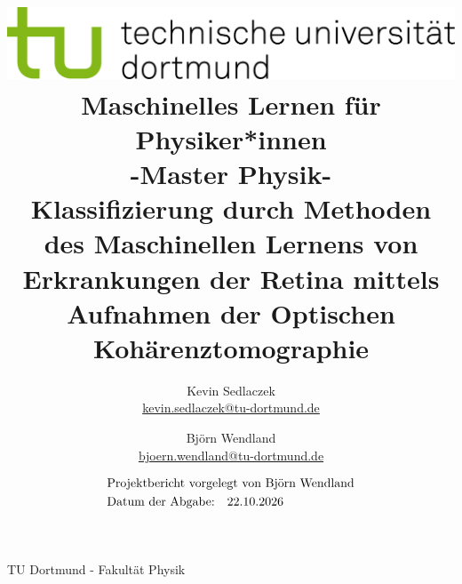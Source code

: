 \documentclass[12pt,a4paper,headsepline,bibtotocnumbered]{scrartcl}
\title{\vspace{-0.7cm}\includegraphics[scale=0.8]{tud-logo.jpg} \\ \vspace*{1cm} Maschinelles Lernen für Physiker*innen \\ -Master Physik- \\ \vspace*{1cm} 
Klassifizierung durch Methoden des Maschinellen Lernens von Erkrankungen der Retina mittels Aufnahmen der Optischen Kohärenztomographie  \vspace*{1cm} }
\author{Kevin Sedlaczek \\ \href{mailto:kevin.sedlaczek@tu-dortmund.de}{kevin.sedlaczek@tu-dortmund.de} \and 
	Björn Wendland \\ \href{mailto:bjoern.wendland@tu-dortmund.de}{bjoern.wendland@tu-dortmund.de}}
\date{ \vspace*{0.5cm} 
\begin{align*}
& \text{Projektbericht vorgelegt von Björn Wendland} \\
& \text{Datum der Abgabe:}  \quad \todayIV
\end{align*}
}
\begin{document}
 \singlespacing
	\maketitle
	\vfill
	{\centering \Large{TU Dortmund - Fakultät Physik} \par}
	\thispagestyle{empty} 
\onehalfspacing
\clearpage 
\tableofcontents
\thispagestyle{empty}
\clearpage
\setcounter{page}{1}


\clearpage
	
	
\clearpage
	
\clearpage
% 	
% 
\printbibliography
\clearpage	
\appendix


\clearpage
\end{document}
